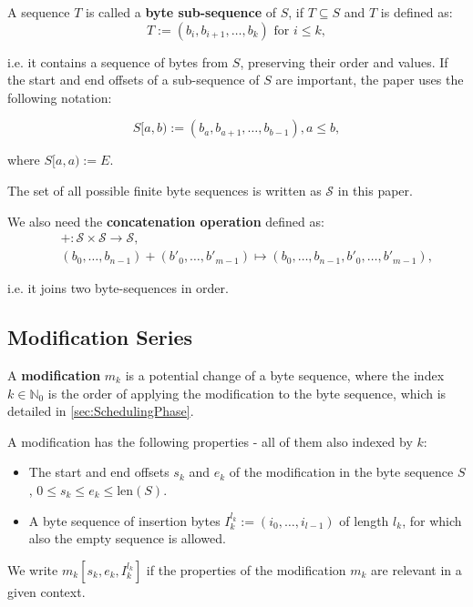 \documentclass[english, 10pt, openright, twocolumn, landscape, twoside, notitlepage, a4paper, pdftex]		
{article}
\begin{document}
A sequence $T$ is called a \textbf{byte sub-sequence} of $S$, if $T\subseteq S$ and $T$ is defined as:
\[T:=(b_{i}, b_{i+1}, \ldots, b_{k})\text{ for }i\leq k,\]

i.e. it contains a sequence of bytes from $S$, preserving their order and values. If the start and end offsets of a sub-sequence of $S$ are important, the paper uses the following notation:

\[S[a, b):=(b_{a}, b_{a+1}, \ldots, b_{b-1}),a\leq b,\]

where $S[a, a):=E.$

The set of all possible finite byte sequences is written as $\mathcal{S}$ in this paper.

We also need the \textbf{concatenation operation} defined as:
\begin{eqnarray*}
  &&+:\mathcal{S}\times \mathcal{S} \rightarrow \mathcal{S}, \\
&&(b_{0},\ldots,b_{n-1})+(b'_{0},\ldots,b'_{m-1}) \mapsto (b_{0},\ldots,b_{n-1}, b'_{0},\ldots,b'_{m-1}),
\end{eqnarray*}

i.e. it joins two byte-sequences in order.

\subsection{Modification Series}%
\label{sec:ModificationSeries}%

A \textbf{modification} $m_{k}$ is a potential change of a byte sequence, where the index $k\in\mathbb{N}_{0}$ is the order of applying the modification to the byte sequence, which is detailed in \ref{sec:SchedulingPhase}.

A modification has the following properties - all of them also indexed by $k$:
\begin{itemize}
\item The start and end offsets $s_{k}$ and $e_{k}$ of the modification in the byte sequence $S$, $0\leq s_{k}\leq e_{k}\leq \text{len}(S)$.
\item A byte sequence of insertion bytes $I_{k}^{l_{k}}:=(i_{0},\ldots,i_{l-1})$ of length $l_{k}$, for which also the empty sequence is allowed.
\end{itemize}

We write $m_{k}[s_{k}, e_{k}, I_{k}^{l_{k}}]$ if the properties of the modification $m_{k}$ are relevant in a given context.
\end{document}
